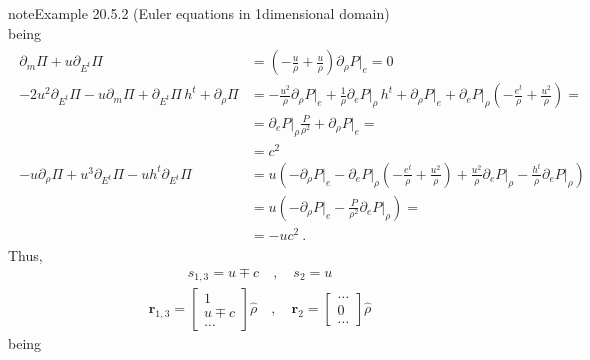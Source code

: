 \documentclass[letterpaper,10pt,english]{jupyterBook}
\begin{document}
\begin{sphinxadmonition}{note}{Example 20.5.2 (Euler equations in 1\sphinxhyphen{}dimensional domain)}
\begin{equation*}
\end{equation*}
\sphinxAtStartPar
being
\begin{equation*}
\begin{split}\begin{aligned}
  \partial_m \Pi + u \partial_{E^t} \Pi
  & = \left( - \frac{u}{\rho}  + \frac{u}{\rho} \right) \partial_\rho P \big|_e = 0 \\
  - 2u^2 \partial_{E^t} \Pi - u \partial_m \Pi + \partial_{E^t} \Pi \, h^t + \partial_{\rho} \Pi 
  & =  - \frac{u^2}{\rho} \partial_\rho P\big|_e + \frac{1}{\rho} \partial_e P\big|_\rho \, h^t + \partial_\rho P\big|_e + \partial_e P\big|_\rho \left( -\frac{e^t}{\rho} + \frac{u^2}{\rho} \right) = \\
  & = \partial_{e} P \big|_{\rho} \frac{P}{\rho^2} + \partial_{\rho} P \big|_e = \\
  & = c^2 \\
 - u \partial_{\rho} \Pi + u^3 \partial_{E^t} \Pi - u h^t \partial_{E^t} \Pi
  & = u \left( - \partial_\rho P \big|_e - \partial_e P \big|_{\rho} \left( -\frac{e^t}{\rho} + \frac{u^2}{\rho} \right) + \frac{u^2}{\rho} \partial_e P\big|_\rho - \frac{h^t}{\rho} \partial_e P\big|_{\rho}  \right) \\
  & = u \left( -\partial_\rho P\big|_e - \frac{P}{\rho^2} \partial_e P \big|_\rho \right) = \\
  & = - u c^2 \ .
\end{aligned}\end{split}
\end{equation*}
\sphinxAtStartPar
Thus,
\begin{equation*}
\begin{split}s_{1,3} = u \mp c \quad , \quad s_{2} = u \end{split}
\end{equation*}\begin{equation*}
\begin{split}
\mathbf{r}_{1,3} = \begin{bmatrix} 1 \\ u \mp c \\ \dots \end{bmatrix} \hat{\rho}
 \quad , \quad
\mathbf{r}_2 = \begin{bmatrix} \dots \\ 0 \\ \dots \end{bmatrix} \hat{\rho}
\end{split}
\end{equation*}
\sphinxAtStartPar
being

\end{sphinxadmonition}
\end{document}
